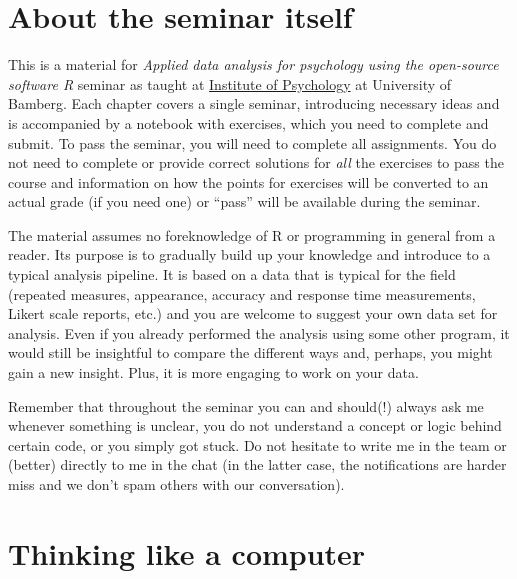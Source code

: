 \documentclass[
]{book}
\begin{document}
\hypertarget{about-the-seminar-itself}{%
\section*{About the seminar itself}\label{about-the-seminar-itself}}

This is a material for \emph{Applied data analysis for psychology using the open-source software R} seminar as taught at \href{https://www.uni-bamberg.de/psychologie/}{Institute of Psychology} at University of Bamberg. Each chapter covers a single seminar, introducing necessary ideas and is accompanied by a notebook with exercises, which you need to complete and submit. To pass the seminar, you will need to complete all assignments. You do not need to complete or provide correct solutions for \emph{all} the exercises to pass the course and information on how the points for exercises will be converted to an actual grade (if you need one) or ``pass'' will be available during the seminar.

The material assumes no foreknowledge of R or programming in general from a reader. Its purpose is to gradually build up your knowledge and introduce to a typical analysis pipeline. It is based on a data that is typical for the field (repeated measures, appearance, accuracy and response time measurements, Likert scale reports, etc.) and you are welcome to suggest your own data set for analysis. Even if you already performed the analysis using some other program, it would still be insightful to compare the different ways and, perhaps, you might gain a new insight. Plus, it is more engaging to work on your data.

Remember that throughout the seminar you can and should(!) always ask me whenever something is unclear, you do not understand a concept or logic behind certain code, or you simply got stuck. Do not hesitate to write me in the team or (better) directly to me in the chat (in the latter case, the notifications are harder miss and we don't spam others with our conversation).

\hypertarget{thinking-like-a-computer}{%
\section*{Thinking like a computer}\label{thinking-like-a-computer}}
\end{document}
